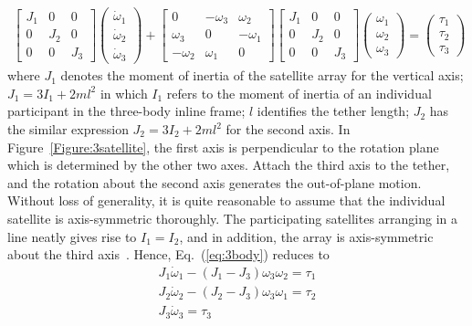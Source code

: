 \begin{align}
\begin{bmatrix}
J_1 &0  &0\\
0   &J_2&0\\
0   &0  &J_3
\end{bmatrix}\begin{pmatrix}
\dot{\omega}_1\\
\dot{\omega}_2\\
\dot{\omega}_3
\end{pmatrix}+\begin{bmatrix}
0   &-\omega_3  &\omega_2\\
\omega_3   &0   &-\omega_1\\
-\omega_2   &\omega_1  &0
\end{bmatrix}\begin{bmatrix}
J_1 &0  &0\\
0   &J_2&0\\
0   &0  &J_3
\end{bmatrix}\begin{pmatrix}
{\omega}_1\\
{\omega}_2\\
{\omega}_3
\end{pmatrix}=\begin{pmatrix}
\tau_1\\
\tau_2\\
\tau_3
\end{pmatrix}\label{eq:3body}
\end{align}
where $J_1$ denotes the moment of inertia of the satellite array for the vertical axis; $J_1=3I_1+2ml^2$ in which $I_1$ refers to the moment of inertia of an individual participant in the three-body inline frame; $l$ identifies the tether length; $J_2$ has the similar expression $J_2=3I_2+2ml^2$ for the second axis. In Figure~\ref{Figure:3satellite}, the first axis is perpendicular to the rotation plane which is determined by the other two axes. Attach the third axis to the tether, and the rotation about the second axis generates the out-of-plane motion. Without loss of generality, it is quite reasonable to assume that the individual satellite is axis-symmetric thoroughly. The participating satellites arranging in a line neatly gives rise to $I_1=I_2$, and in addition, the array is axis-symmetric about the third axis~\cite{chung2008propellant1}. Hence, Eq.~(\ref{eq:3body}) reduces to
\begin{align}
J_1\dot{\omega}_1-(J_1-J_3)\omega_3\omega_2=\tau_1\label{eq:3model1}\\
J_2\dot{\omega}_2-(J_2-J_3)\omega_3\omega_1=\tau_2\label{eq:3model2}\\
J_3\dot{\omega}_3=\tau_3\label{eq:3model}
\end{align}
